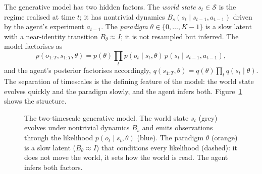 \documentclass[11pt,a4paper]{article}
\newcommand{\theory}{\theta}
\begin{document}
The generative model has two hidden factors. The \emph{world state}
$s_t\in\mathcal S$ is the regime realised at time $t$; it has nontrivial dynamics
$B_s(s_t\mid s_{t-1},a_{t-1})$ driven by the agent's experiment $a_{t-1}$. The
\emph{paradigm} $\theory\in\{0,\dots,K{-}1\}$ is a slow latent with a
near-identity transition $B_\theory\approx I$; it is not resampled but inferred.
The model factorises as
\begin{equation}
p(o_{1:T},s_{1:T},\theory)
= p(\theory)\prod_{t} p(o_t\mid s_t,\theory)\,
   p(s_t\mid s_{t-1},a_{t-1}) ,
\label{eq:gen}
\end{equation}
and the agent's posterior factorises accordingly,
$q(s_{1:T},\theory)=q(\theory)\prod_t q(s_t\mid\theory)$. The separation of
timescales is the defining feature of the model: the world state evolves quickly
and the paradigm slowly, and the agent infers both.
Figure~\ref{fig:factor} shows the structure.

\begin{figure}[t]
\centering
{}
\caption{The two-timescale generative model. The world state $s_t$ (grey) evolves
under nontrivial dynamics $B_s$ and emits observations through the likelihood
$p(o_t\mid s_t,\theory)$ (blue). The paradigm $\theory$ (orange) is a slow latent
($B_\theory\approx I$) that conditions every likelihood (dashed): it does not move
the world, it sets how the world is read. The agent infers both factors.}
\label{fig:factor}
\end{figure}
\end{document}
